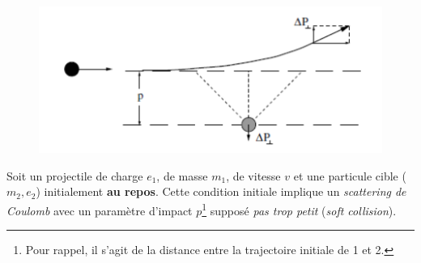 	\begin{figure}
	\vspace{-8mm}
	\includegraphics[scale=0.55]{ch1/image6.png}
	\label{fig:1.6}
	\end{figure}
Soit un projectile de charge $e_1$, de masse $m_1$, de vitesse $v$ et une particule cible
($m_2,e_2$) initialement \textbf{au repos}. Cette condition initiale implique un 
\textit{scattering de Coulomb} avec un paramètre d'impact $p$\footnote{Pour rappel, il 
s'agit de la distance entre la trajectoire initiale de 1 et 2.} supposé \textit{pas trop 
petit} (\textit{soft collision}).\\

